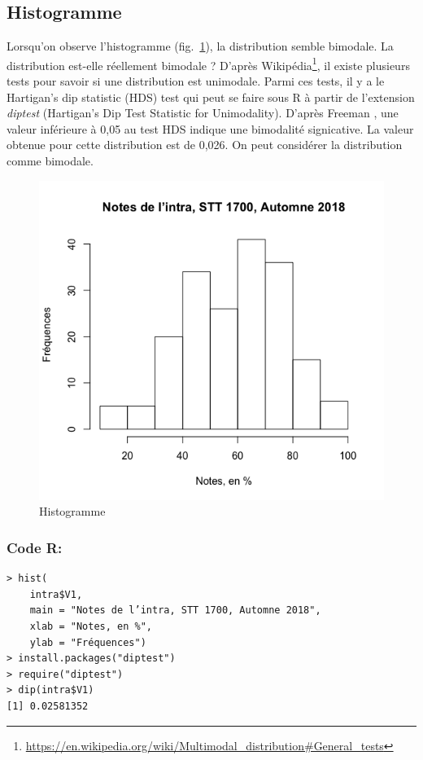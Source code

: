 \documentclass[10pt,twocolumn]{article}
\begin{document}
\subsection{Histogramme}
\label{histogramme}
Lorsqu’on observe l’histogramme (fig.~\ref{intraHist}), la distribution semble bimodale. La distribution est-elle réellement bimodale ? D’après Wikipédia\footnote{\url{https://en.wikipedia.org/wiki/Multimodal\_distribution\#General\_tests}}, il existe plusieurs tests pour savoir si une distribution est unimodale. Parmi ces tests, il y a le Hartigan’s dip statistic (HDS) test qui peut se faire sous R à partir de l’extension \textit{diptest} (Hartigan's Dip Test Statistic for Unimodality). D’après Freeman \cite{Freeman:2013aa}, une valeur inférieure à 0,05 au test HDS indique une bimodalité signicative. La valeur obtenue pour cette distribution est de 0,026. On peut considérer la distribution comme bimodale.


\begin{figure}[htbp]
	\caption{Histogramme}
	\label{intraHist}
	\centering
	\includegraphics[width=\linewidth]{d1_intraHist}
\end{figure}

\subsubsection*{Code R:}
\begin{verbatim}
> hist(
    intra$V1,
    main = "Notes de l’intra, STT 1700, Automne 2018",
    xlab = "Notes, en %",
    ylab = "Fréquences")
> install.packages("diptest")
> require("diptest")
> dip(intra$V1)
[1] 0.02581352
\end{verbatim}
\end{document}
